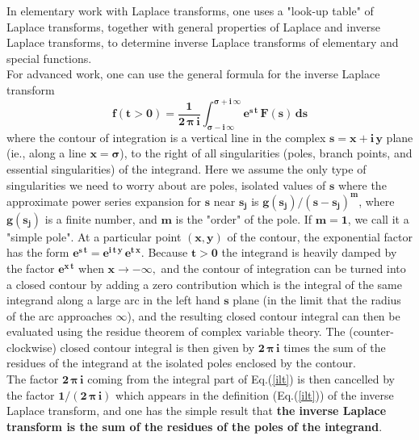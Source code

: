 \documentclass[12pt]{article}
\begin{document}
\noindent In elementary work with Laplace transforms, one uses a "look-up table" of
  Laplace transforms, together with general properties of Laplace and inverse
  Laplace transforms, to determine inverse Laplace transforms of elementary and
  special functions.\\
  
\noindent For advanced work, one can use the general formula for the inverse Laplace
  transform
\begin{equation}  \label{ilt}
\mathbf{f(t>0) = \frac{1}{2\,\boldsymbol{\pi}\,i}
   \int_{\boldsymbol{\sigma} - i\, \infty}^{\boldsymbol{\sigma} + i\,\infty} e^{s\,t}\,F(s)\,ds}
\end{equation}
where the contour of integration is a vertical line in the complex $\mathbf{s = x + i\,y}$ plane
  (ie., along a line $\mathbf{x = \boldsymbol{\sigma}}$),
  to the right of all singularities (poles, branch points,
  and essential singularities) of the integrand.
Here we assume the only type of singularities we need to worry about are poles, isolated
  values of $\mathbf{s}$ where the approximate power series expansion for $\mathbf{s}$
  near $\mathbf{s_{j}}$ is
  $\mathbf{g(s_{j})/(s - s_{j})^m}$, where $\mathbf{g(s_{j})}$ is a finite number,
  and $\mathbf{m}$ is the "order" of the pole.
If $\mathbf{m = 1}$, we call it a "simple pole".
At a particular point $\mathbf{(x,y)}$ of the contour, the exponential factor has the form
  $\mathbf{e^{s\,t} = e^{i\,t\,y}\, e^{t\,x}}$.
Because $\mathbf{t > 0}$ the integrand is heavily damped by the factor $\mathbf{e^{x\,t}}$ when
  $\mathbf{x \rightarrow -\infty},$ and the contour of integration can be turned into a closed contour
  by adding a zero contribution  which is the integral of the same integrand along 
   a large arc in the left hand $\mathbf{s}$ plane (in the limit that the radius of the arc
   approaches $\mathbf{\infty}$), and  the resulting closed contour integral
   can then be evaluated using the residue theorem of  complex variable theory.
The (counter-clockwise) closed contour integral is then given by $\mathbf{2\,\boldsymbol{\pi} \,i}$
  times the sum of the residues of the integrand at the isolated poles enclosed by the contour.\\

\noindent The factor $\mathbf{2\,\boldsymbol{\pi} \,i}$ coming from the integral part of Eq.(\ref{ilt})
 is then cancelled by the factor $\mathbf{1/(2\,\boldsymbol{\pi} \,i)}$  which appears in
 the definition (Eq.(\ref{ilt})) of the inverse Laplace transform, and one has the 
 simple result that \textbf{the inverse Laplace transform is
  the sum of the residues of the poles of the integrand}.
\end{document}
